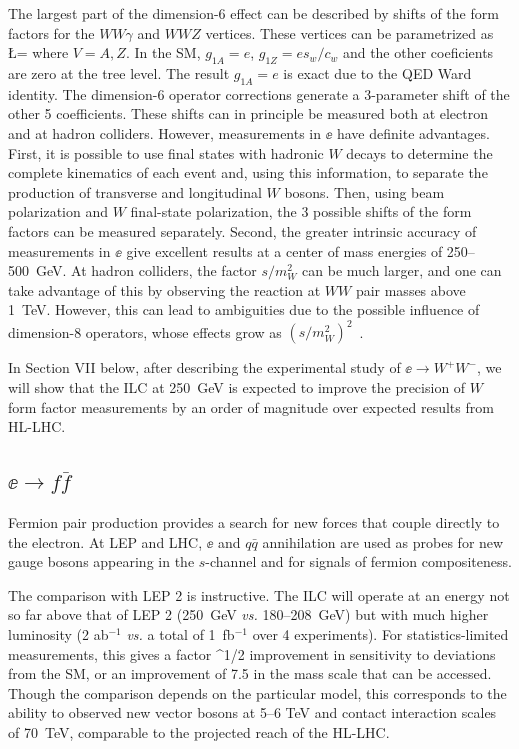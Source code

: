 The largest part of the dimension-6 effect can be described by shifts of the form 
factors for the $WW\gamma$ and $WWZ$ vertices.  These vertices can be parametrized as \cite{Hagiwara:1986vm}
\beq
\Delta \L = 
where $V = A,Z$.  In the SM, $g_{1A} = e$, $g_{1Z} = e s_w/c_w$ and the other coeficients are zero at the tree level.   The result $g_{1A} = e$ is exact due to the QED Ward identity.  The dimension-6 operator corrections generate a 3-parameter shift of the other 5 coefficients. These shifts can in principle be measured both at electron and at hadron colliders.  However, measurements in $\ee$ have  definite advantages.   First, it is possible to use final states with hadronic $W$ decays to determine the complete kinematics of each event and, using this information, to separate the production of 
transverse and longitudinal $W$ bosons.   Then, using beam polarization and $W$ final-state polarization, the 3 possible shifts of the form factors can be measured separately.   Second,  the greater intrinsic accuracy of measurements in $\ee$ give excellent results at a center of mass energies of 250--500~GeV.  At hadron colliders, 
the factor $s/m_W^2$ can be much larger, and one can take advantage of this by observing the reaction at $WW$ pair masses above 1~TeV.  However, this can lead to ambiguities due to the possible influence of dimension-8 operators, whose effects grow as $(s/m_W^2)^2$~\cite{Falkowski:2016cxu}. 

In Section VII  below, after describing the experimental study of $\ee\to W^+W^-$, we will show that the ILC at 250~GeV is expected to improve the precision of $W$ form factor measurements by an order of magnitude over expected results from HL-LHC.




\subsection{$\ee\to f\bar f$}
\label{subsec:phys_ff}

Fermion pair production provides a search for new forces that couple directly to the electron.   At LEP and LHC, $\ee$ and $q\bar q$ annihilation are used as probes for new gauge bosons appearing in the $s$-channel and for signals of fermion compositeness. 

The comparison with LEP 2 is instructive.   The ILC will operate at an energy not so far above that of LEP 2  (250~GeV {\it vs.}  180--208~GeV)  but with much higher luminosity (2 ab$^{-1}$  {\it vs.} a total of 1~fb$^{-1}$ over 4 experiments).   For statistics-limited measurements, this gives a factor 
\beq
   ^{1/2}  
\eeqn
improvement in sensitivity to deviations from the SM, or an improvement of  7.5 in the mass scale that can be accessed.   Though the comparison depends on the particular model, this corresponds to the ability to observed new vector bosons at 5--6 TeV and 
contact interaction scales of 70~TeV, comparable to  the projected reach of the HL-LHC. 

